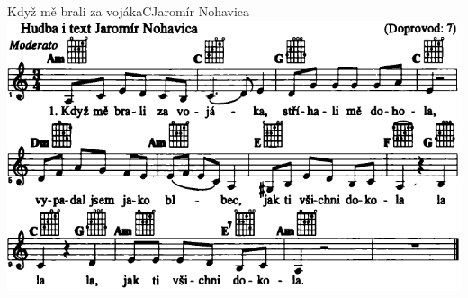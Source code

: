 \setcounter{page}{41}
\begin{song}{Když mě brali za vojáka}{C}{Jaromír Nohavica}
\includegraphics[width=\textwidth]{noty/a_když-mě-brali-za-vojáka} \end{song} \pagebreak
